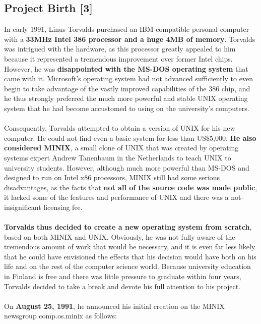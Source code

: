 \documentclass[11pt]{article}
\begin{document}
\subsection{Project Birth [3]} 
In early 1991, Linus Torvalds purchased an IBM-compatible personal computer with a \textbf{33MHz Intel 386 processor and a huge 4MB of memory}. Torvalds was intrigued with the hardware, as this processor greatly appealed to him because it represented a tremendous improvement over former Intel chips. However, he was \textbf{disappointed with the MS-DOS operating system} that came with it. Microsoft's operating system had not advanced sufficiently to even begin to take advantage of the vastly improved capabilities of the 386 chip, and he thus strongly preferred the much more powerful and stable UNIX operating system that he had become accustomed to using on the university's computers.\\
\\
Consequently, Torvalds attempted to obtain a version of UNIX for his new computer. He could not find even a basic system for less than US\$5,000. \textbf{He also considered MINIX}, a small clone of UNIX that was created by operating systems expert Andrew Tanenbaum in the Netherlands to teach UNIX to university students. However, although much more powerful than MS-DOS and designed to run on Intel x86 processors, MINIX still had some serious disadvantages, as the facts that \textbf{not all of the source code was made public}, it lacked some of the features and performance of UNIX and there was a not-insignificant licensing fee.\\
\\
\textbf{Torvalds thus decided to create a new operating system from scratch}, based on both MINIX and UNIX. Obviously, he was not fully aware of the tremendous amount of work that would be necessary, and it is even far less likely that he could have envisioned the effects that his decision would have both on his life and on the rest of the computer science world. Because university education in Finland is free and there was little pressure to graduate within four years, Torvalds decided to take a break and devote his full attention to his project.\\
\\
On \textbf{August 25, 1991}, he announced his initial creation on the MINIX newsgroup comp.os.minix as follows:
\end{document}
